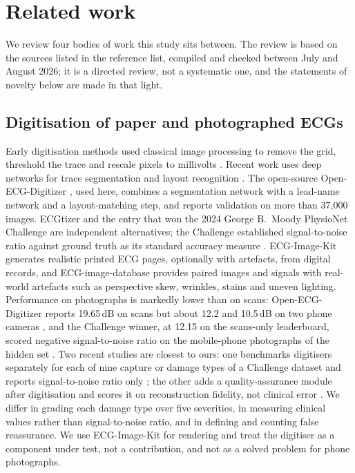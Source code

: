 \section{Related work}\label{sec:related}

We review four bodies of work this study sits between. The review is based on the sources listed in the reference list, compiled and checked between July and August 2026; it is a directed review, not a systematic one, and the statements of novelty below are made in that light.

\subsection{Digitisation of paper and photographed ECGs}
Early digitisation methods used classical image processing to remove the grid, threshold the trace and rescale pixels to millivolts \citep{ref6,ref7,ref8,ref9}. Recent work uses deep networks for trace segmentation and layout recognition \citep{ref10,ref11}. The open-source Open-ECG-Digitizer \citep{ref5}, used here, combines a segmentation network with a lead-name network and a layout-matching step, and reports validation on more than 37{,}000 images. ECGtizer \citep{ref3} and the entry that won the 2024 George B.\ Moody PhysioNet Challenge \citep{ref53} are independent alternatives; the Challenge established signal-to-noise ratio against ground truth as its standard accuracy measure \citep{ref2}. ECG-Image-Kit \citep{ref1} generates realistic printed ECG pages, optionally with artefacts, from digital records, and ECG-image-database \citep{ref4} provides paired images and signals with real-world artefacts such as perspective skew, wrinkles, stains and uneven lighting. Performance on photographs is markedly lower than on scans: Open-ECG-Digitizer reports 19.65\,dB on scans but about 12.2 and 10.5\,dB on two phone cameras \citep{ref5}, and the Challenge winner, at 12.15 on the scans-only leaderboard, scored negative signal-to-noise ratio on the mobile-phone photographs of the hidden set \citep{ref53}. Two recent studies are closest to ours: one benchmarks digitisers separately for each of nine capture or damage types of a Challenge dataset and reports signal-to-noise ratio only \citep{ref54}; the other adds a quality-assurance module after digitisation and scores it on reconstruction fidelity, not clinical error \citep{ref55}. We differ in grading each damage type over five severities, in measuring clinical values rather than signal-to-noise ratio, and in defining and counting false reassurance. We use ECG-Image-Kit for rendering and treat the digitiser as a component under test, not a contribution, and not as a solved problem for phone photographs.

